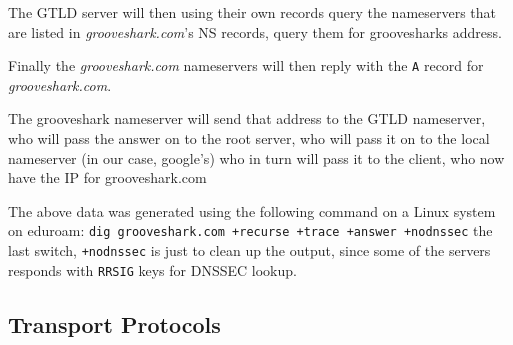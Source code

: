 \documentclass[10pt]{article}
\begin{document}
\begin{enumerate}
      The GTLD server will then using their own records query the nameservers
      that are listed in \textit{grooveshark.com}'s NS records, query them for
      groovesharks address.
      Finally the \textit{grooveshark.com} nameservers will then reply with the
      \texttt{A} record for \textit{grooveshark.com}.
      The grooveshark nameserver will send that address to the GTLD nameserver,
      who will pass the answer on to the root server, who will pass it on to
      the local nameserver (in our case, google's) who in turn will pass it to
      the client, who now have the IP for grooveshark.com

      \noindent The above data was generated using the following command on a
      Linux system on eduroam:
      \texttt{dig grooveshark.com +recurse +trace +answer +nodnssec}
      the last switch, \texttt{+nodnssec} is just to clean up the output, since
      some of the servers responds with \texttt{RRSIG} keys for DNSSEC lookup.
\end{enumerate}


\subsection{Transport Protocols}
\end{document}
